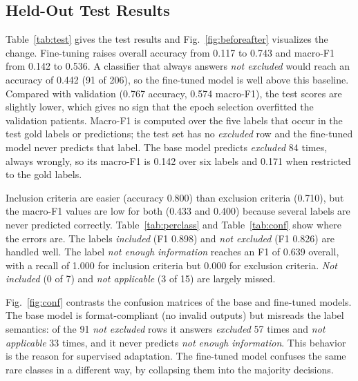 \documentclass[conference]{IEEEtran}
\begin{document}
\subsection{Held-Out Test Results}
Table~\ref{tab:test} gives the test results and Fig.~\ref{fig:beforeafter} visualizes the change. Fine-tuning raises overall accuracy from 0.117 to 0.743 and macro-F1 from 0.142 to 0.536. A classifier that always answers \emph{not excluded} would reach an accuracy of 0.442 (91 of 206), so the fine-tuned model is well above this baseline. Compared with validation (0.767 accuracy, 0.574 macro-F1), the test scores are slightly lower, which gives no sign that the epoch selection overfitted the validation patients. Macro-F1 is computed over the five labels that occur in the test gold labels or predictions; the test set has no \emph{excluded} row and the fine-tuned model never predicts that label. The base model predicts \emph{excluded} 84 times, always wrongly, so its macro-F1 is 0.142 over six labels and 0.171 when restricted to the gold labels.

Inclusion criteria are easier (accuracy 0.800) than exclusion criteria (0.710), but the macro-F1 values are low for both (0.433 and 0.400) because several labels are never predicted correctly. Table~\ref{tab:perclass} and Table~\ref{tab:conf} show where the errors are. The labels \emph{included} (F1 0.898) and \emph{not excluded} (F1 0.826) are handled well. The label \emph{not enough information} reaches an F1 of 0.639 overall, with a recall of 1.000 for inclusion criteria but 0.000 for exclusion criteria. \emph{Not included} (0 of 7) and \emph{not applicable} (3 of 15) are largely missed.

Fig.~\ref{fig:conf} contrasts the confusion matrices of the base and fine-tuned models. The base model is format-compliant (no invalid outputs) but misreads the label semantics: of the 91 \emph{not excluded} rows it answers \emph{excluded} 57 times and \emph{not applicable} 33 times, and it never predicts \emph{not enough information}. This behavior is the reason for supervised adaptation. The fine-tuned model confuses the same rare classes in a different way, by collapsing them into the majority decisions.
\end{document}

